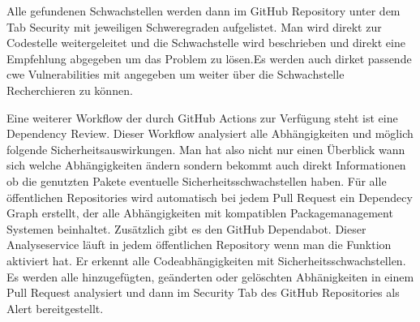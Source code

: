 Alle gefundenen Schwachstellen werden dann im GitHub Repository unter dem Tab Security mit jeweiligen Schweregraden aufgelistet. Man wird direkt zur Codestelle weitergeleitet und die Schwachstelle wird beschrieben und direkt eine Empfehlung abgegeben um das Problem zu lösen.Es werden auch dirket passende \ac{cwe} Vulnerabilities mit angegeben um weiter über die Schwachstelle Recherchieren zu können. \cite{code-scanning}

Eine weiterer Workflow der durch GitHub Actions zur Verfügung steht ist eine Dependency Review. Dieser Workflow analysiert alle Abhängigkeiten und möglich folgende Sicherheitsauswirkungen. Man hat also nicht nur einen Überblick wann sich welche Abhängigkeiten ändern sondern bekommt auch direkt Informationen ob die genutzten Pakete eventuelle Sicherheitsschwachstellen haben.
Für alle öffentlichen Repositories wird automatisch bei jedem Pull Request ein Dependecy Graph erstellt, der alle Abhängigkeiten mit kompatiblen Packagemanagement Systemen beinhaltet.
Zusätzlich gibt es den GitHub Dependabot. Dieser Analyseservice läuft in jedem öffentlichen Repository wenn man die Funktion aktiviert hat. Er erkennt alle Codeabhängigkeiten mit Sicherheitsschwachstellen. Es werden alle hinzugefügten, geänderten oder gelöschten Abhänigkeiten in einem Pull Request analysiert und dann im Security Tab des GitHub Repositories als Alert bereitgestellt.

